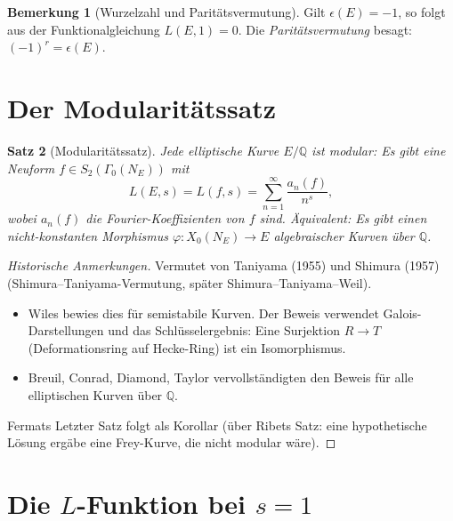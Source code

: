 \documentclass[12pt,a4paper]{amsart}
\newtheorem{theorem}{Satz}[section]
\theoremstyle{definition}
\newtheorem{remark}[theorem]{Bemerkung}
\newcommand{\Q}{\mathbb{Q}}
\begin{document}
\begin{remark}[Wurzelzahl und Parit\"atsvermutung]
Gilt $\epsilon(E) = -1$, so folgt aus der Funktionalgleichung $L(E,1) = 0$.
Die \emph{Parit\"atsvermutung} besagt: $(-1)^r = \epsilon(E)$.
\end{remark}

\section{Der Modularit\"atssatz}

\begin{theorem}[Modularit\"atssatz]
\label{thm:modularity}
Jede elliptische Kurve $E/\Q$ ist \emph{modular}: Es gibt eine Neuform
$f \in S_2(\Gamma_0(N_E))$ mit
\[
  L(E,s) = L(f,s) = \sum_{n=1}^{\infty} \frac{a_n(f)}{n^s},
\]
wobei $a_n(f)$ die Fourier-Koeffizienten von $f$ sind.
\"Aquivalent: Es gibt einen nicht-konstanten Morphismus
$\varphi: X_0(N_E) \to E$ algebraischer Kurven \"uber $\Q$.
\end{theorem}

\begin{proof}[Historische Anmerkungen]
Vermutet von Taniyama (1955) und Shimura (1957)
(Shimura--Taniyama-Vermutung, sp\"ater Shimura--Taniyama--Weil).
\begin{itemize}
  \item Wiles \cite{Wiles1995} bewies dies f\"ur semistabile Kurven.
    Der Beweis verwendet Galois-Darstellungen und das Schl\"usselergebnis:
    Eine Surjektion $R \to T$ (Deformationsring auf Hecke-Ring) ist ein
    Isomorphismus.
  \item Breuil, Conrad, Diamond, Taylor \cite{BCDT2001} vervollst\"andigten
    den Beweis f\"ur alle elliptischen Kurven \"uber $\Q$.
\end{itemize}
Fermats Letzter Satz folgt als Korollar (\"uber Ribets Satz: eine
hypothetische L\"osung ergäbe eine Frey-Kurve, die nicht modular w\"are).
\end{proof}

\section{Die $L$-Funktion bei \texorpdfstring{$s=1$}{s=1}}
\end{document}
